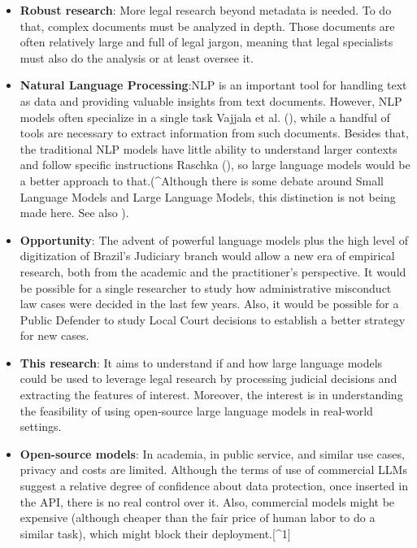 \documentclass[
  12pt,
]{article}
\begin{document}
\begin{itemize}
\item
  \textbf{Robust research}: More legal research beyond metadata is
  needed. To do that, complex documents must be analyzed in depth. Those
  documents are often relatively large and full of legal jargon, meaning
  that legal specialists must also do the analysis or at least oversee
  it.
\item
  \textbf{Natural Language Processing}:NLP is an important tool for
  handling text as data and providing valuable insights from text
  documents. However, NLP models often specialize in a single task
  Vajjala et al. (), while a
  handful of tools are necessary to extract information from such
  documents. Besides that, the traditional NLP models have little
  ability to understand larger contexts and follow specific instructions
  Raschka (), so large language
  models would be a better approach to that.(\^{}Although there is some
  debate around Small Language Models and Large Language Models, this
  distinction is not being made here. See also
  ).
\item
  \textbf{Opportunity}: The advent of powerful language models plus the
  high level of digitization of Brazil's Judiciary branch would allow a
  new era of empirical research, both from the academic and the
  practitioner's perspective. It would be possible for a single
  researcher to study how administrative misconduct law cases were
  decided in the last few years. Also, it would be possible for a Public
  Defender to study Local Court decisions to establish a better strategy
  for new cases.
\item
  \textbf{This research}: It aims to understand if and how large
  language models could be used to leverage legal research by processing
  judicial decisions and extracting the features of interest. Moreover,
  the interest is in understanding the feasibility of using open-source
  large language models in real-world settings.
\item
  \textbf{Open-source models}: In academia, in public service, and
  similar use cases, privacy and costs are limited. Although the terms
  of use of commercial LLMs suggest a relative degree of confidence
  about data protection, once inserted in the API, there is no real
  control over it. Also, commercial models might be expensive (although
  cheaper than the fair price of human labor to do a similar task),
  which might block their deployment.{[}\^{}1{]}
\end{itemize}
\end{document}
